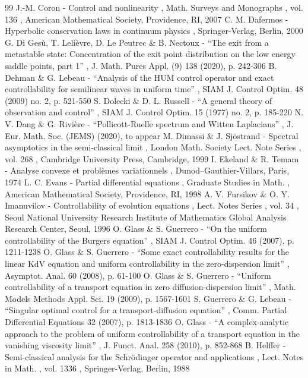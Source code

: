 \documentclass[11pt]{article}
\numberwithin{equation}{section}
\theoremstyle{definition}
\begin{document}
\begin{thebibliography}{99}
 J.-M. Coron - Control and nonlinearity , Math. Surveys and Monographs , vol. 136 , American Mathematical Society, Providence, RI, 2007
 C. M. Dafermos - Hyperbolic conservation laws in continuum physics , Springer-Verlag, Berlin, 2000
 G. Di Gesù, T. Lelièvre, D. Le Peutrec \& B. Nectoux - “The exit from a metastable state: Concentration of the exit point distribution on the low energy saddle points, part 1” , J. Math. Pures Appl. (9) 138 (2020), p. 242-306
 B. Dehman \& G. Lebeau - “Analysis of the HUM control operator and exact controllability for semilinear waves in uniform time” , SIAM J. Control Optim. 48 (2009) no. 2, p. 521-550
 S. Dolecki \& D. L. Russell - “A general theory of observation and control” , SIAM J. Control Optim. 15 (1977) no. 2, p. 185-220
 N. V. Dang \& G. Rivière - “Pollicott-Ruelle spectrum and Witten Laplacians” , J. Eur. Math. Soc. (JEMS) (2020), to appear
 M. Dimassi \& J. Sjöstrand - Spectral asymptotics in the semi-classical limit , London Math. Society Lect. Note Series , vol. 268 , Cambridge University Press, Cambridge, 1999
 I. Ekeland \& R. Temam - Analyse convexe et problèmes variationnels , Dunod–Gauthier-Villars, Paris, 1974
 L. C. Evans - Partial differential equations , Graduate Studies in Math. , American Mathematical Society, Providence, RI, 1998
 A. V. Fursikov \& O. Y. Imanuvilov - Controllability of evolution equations , Lect. Notes Series , vol. 34 , Seoul National University Research Institute of Mathematics Global Analysis Research Center, Seoul, 1996
 O. Glass \& S. Guerrero - “On the uniform controllability of the Burgers equation” , SIAM J. Control Optim. 46 (2007), p. 1211-1238
 O. Glass \& S. Guerrero - “Some exact controllability results for the linear KdV equation and uniform controllability in the zero-dispersion limit” , Asymptot. Anal. 60 (2008), p. 61-100
 O. Glass \& S. Guerrero - “Uniform controllability of a transport equation in zero diffusion-dispersion limit” , Math. Models Methods Appl. Sci. 19 (2009), p. 1567-1601
 S. Guerrero \& G. Lebeau - “Singular optimal control for a transport-diffusion equation” , Comm. Partial Differential Equations 32 (2007), p. 1813-1836
 O. Glass - “A complex-analytic approach to the problem of uniform controllability of a transport equation in the vanishing viscosity limit” , J. Funct. Anal. 258 (2010), p. 852-868
 B. Helffer - Semi-classical analysis for the Schrödinger operator and applications , Lect. Notes in Math. , vol. 1336 , Springer-Verlag, Berlin, 1988

\end{thebibliography}
\end{document}
